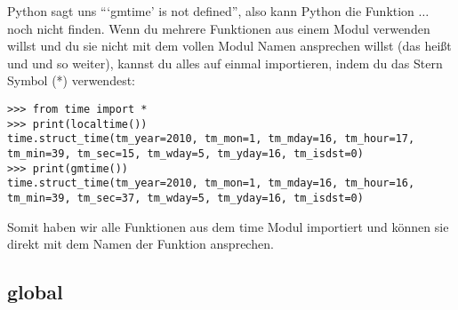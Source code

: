 Python sagt uns ```gmtime' is not defined'', also kann Python die Funktion $\ldots$ noch nicht finden. Wenn du mehrere Funktionen aus einem Modul verwenden willst und du sie nicht mit dem vollen Modul Namen ansprechen willst (das heißt  und  und so weiter), kannst du alles auf einmal importieren, indem du das Stern Symbol (*) verwendest:

\begin{Verbatim}[frame=single]
>>> from time import *
>>> print(localtime())
time.struct_time(tm_year=2010, tm_mon=1, tm_mday=16, tm_hour=17, 
tm_min=39, tm_sec=15, tm_wday=5, tm_yday=16, tm_isdst=0)
>>> print(gmtime())
time.struct_time(tm_year=2010, tm_mon=1, tm_mday=16, tm_hour=16, 
tm_min=39, tm_sec=37, tm_wday=5, tm_yday=16, tm_isdst=0)
\end{Verbatim}

Somit haben wir alle Funktionen aus dem time Modul importiert und können sie direkt mit dem Namen der Funktion ansprechen.

\subsection*{global}

